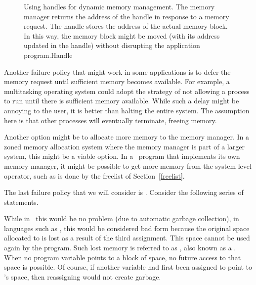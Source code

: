 \begin{figure}
\vspace{-\smallskipamount}

{Using handles for dynamic memory management.
The memory manager returns the address of the handle in response to a
memory request.
The handle stores the address of the actual memory block.
In this way, the memory block might be moved (with its address updated
in the handle) without disrupting the application program.}{Handle}
\bigskip\smallskip
\end{figure}

Another failure policy that might work in some applications is to defer
the memory request until sufficient memory becomes available.
For example, a multitasking operating system
could adopt the strategy of not allowing a process to run until there
is sufficient memory available.
While such a delay might be annoying to the user, it is better than
halting the entire system.
The assumption here is that other processes will eventually
terminate, freeing memory.

Another option might be to allocate more memory to the memory
manager.
In a zoned memory allocation system where the memory manager is
part of a larger system, this might be a viable option.
In a \Lang\ program that implements its own memory manager, it might be
possible to get more memory from the system-level  operator,
such as is done by the freelist of Section~\ref{freelist}.

The last failure policy that we will consider is .
Consider the following series of statements.

\vspace{-\bigskipamount}

\noindent While in \LangJava\ this would be no problem (due to automatic
garbage collection), in languages such as \LangCPP, this would be
considered bad form because the original space allocated to 
is lost as a result of the third assignment.
This space cannot be used again by the program.
Such lost memory is referred to as , also known as a
.
When no program variable points to a block of space, no
future access to that space is possible.
Of course, if another variable had first been assigned to point to
's space, then reassigning  would not create garbage.

